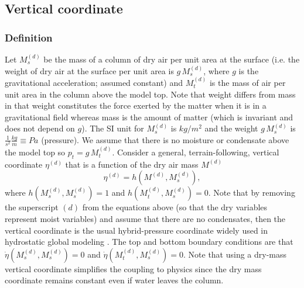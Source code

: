 \documentclass{agujournal}
\begin{document}
{%
%
%
\subsection{Vertical coordinate}\label{eq:vertical_coord}
\subsubsection{Definition}
Let $M^{(d)}_s$ be the mass of a column of dry air per unit area at the surface (i.e. the weight of dry air at the surface per unit area is $g\, M^{(d)}_s$, where $g$ is the gravitational acceleration; assumed constant) and $M_t^{(d)}$ is the mass of air per unit area in the column above the model top. Note that weight differs from mass in that weight constitutes the force exerted by the matter when it is in a gravitational field whereas mass is the amount of matter (which is invariant and does not depend on $g$). The SI unit for $M^{(d)}_s$ is $kg/m^2$ and the weight $g\, M^{(d)}_s$ is $\frac{1}{s^2}\frac{kg}{m}\equiv Pa$ (pressure). We assume that there is no moisture or condensate above the model top so $p_t=g\, M_t^{(d)}$. Consider a general, terrain-following, vertical coordinate $\eta^{(d)}$ that is a function of the dry air mass $M^{(d)}$ 
\begin{equation}
\eta^{(d)}=h(M^{(d)},M_s^{(d)}),
\end{equation}
where $h(M_s^{(d)},M_s^{(d)})=1$ and $h(M_t^{(d)},M_s^{(d)})=0$. Note that by removing the superscript $(d)$ from the equations above (so that the dry variables represent moist variables) and assume that there are no condensates, then the vertical coordinate is the usual hybrid-pressure coordinate widely used in hydrostatic global modeling \citep{SB1981MWR}. The top and bottom boundary conditions are that $\dot{\eta}\left({M_s^{(d)},M_s^{(d)}}\right)=0$ and $\dot{\eta}\left( M_t^{(d)},M_s^{(d)}\right)=0$. Note that using a dry-mass vertical coordinate simplifies the coupling to physics since the dry mass coordinate remains constant even if water leaves the column.
}
\end{document}
